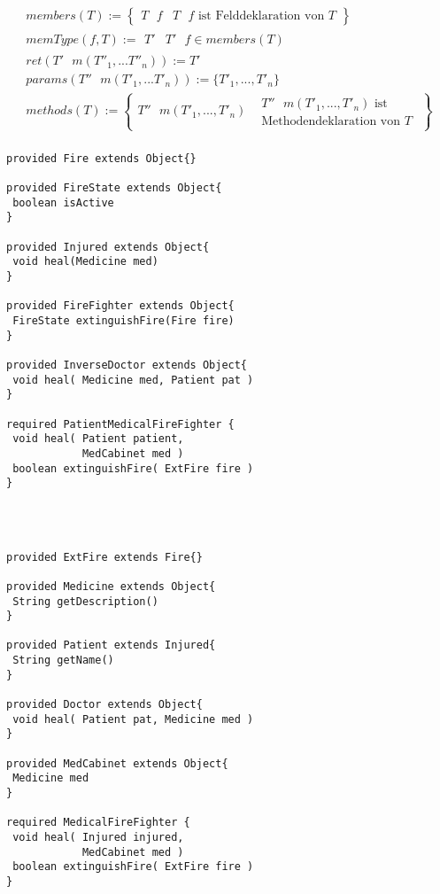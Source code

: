 \begin{gather*}
\mathit{members(T)} :=  \left\{ 
				\begin{array}{l|l}
					T \texttt{ }\mathit{f} & T \texttt{ }\mathit{f}\text{ ist Felddeklaration von }T
				\end{array}
              \right\}
\\
\mathit{memType(f,T)} := 
				\begin{array}{l|l}
					T' & T' \texttt{ }\mathit{f} \in \mathit{members(T)}
				\end{array}   
\\
\mathit{ret(T'\text{ }m(T''_1,...T''_n))} := T'
\\
\mathit{params(T''\text{ }m(T'_1,...T'_n))} := \{ T'_1,...,T'_n \}
\\   
\mathit{methods(T)} := \left\{ 
				\begin{array}{l|l}
					T'' \text{ }m(T'_1,...,T'_n) 
					& 
\begin{array}{l}					
	T'' \text{ }m(T'_1,...,T'_n) \text{ ist}
	\\
	\text{Methodendeklaration von }T
	\end{array}
\end{array}
              \right\}
\\        
\end{gather*}
\noindent
\begin{multicols}{2}
\begin{lstlisting}[caption={Bibliothek \emph{ExampLe} von Typen},captionpos=b, style = dsl, label=lst:libEx]
provided Fire extends Object{}

provided FireState extends Object{
 boolean isActive
}

provided Injured extends Object{
 void heal(Medicine med)	
}

provided FireFighter extends Object{
 FireState extinguishFire(Fire fire)
}

provided InverseDoctor extends Object{	
 void heal( Medicine med, Patient pat )
}

required PatientMedicalFireFighter {
 void heal( Patient patient, 
            MedCabinet med )
 boolean extinguishFire( ExtFire fire )	
}




provided ExtFire extends Fire{}

provided Medicine extends Object{
 String getDescription()
}

provided Patient extends Injured{
 String getName()
}

provided Doctor extends Object{	
 void heal( Patient pat, Medicine med )
}

provided MedCabinet extends Object{
 Medicine med
}

required MedicalFireFighter {
 void heal( Injured injured, 
            MedCabinet med )
 boolean extinguishFire( ExtFire fire )	
}
\end{lstlisting}
\end{multicols}
\noindent


